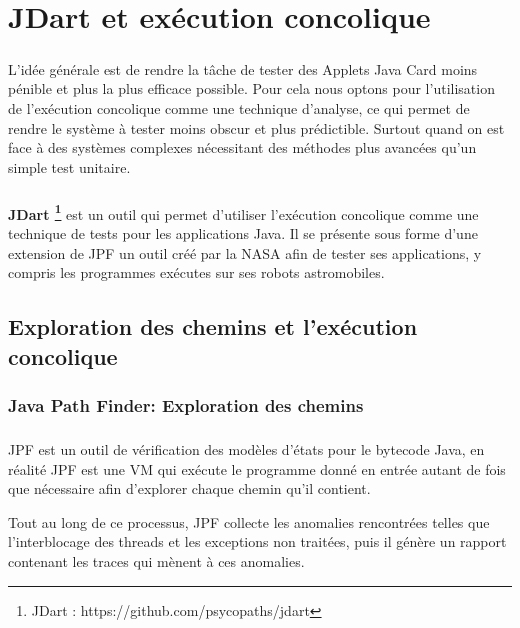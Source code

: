 \chapter{JDart et exécution concolique}
	\paragraph{}
		L'idée générale est de rendre la tâche de tester des Applets Java Card moins pénible et plus la plus efficace possible.
		Pour cela nous optons pour l'utilisation de l'exécution concolique comme une technique d'analyse, ce qui permet de rendre 
		le système à tester moins obscur et plus prédictible. Surtout quand on est face à des systèmes complexes
		nécessitant des méthodes plus avancées qu'un simple test unitaire.
    
	\paragraph{}
		\textbf{JDart \footnote{JDart : https://github.com/psycopaths/jdart}} est un outil qui permet d'utiliser l'exécution concolique
		comme une technique de tests pour les applications Java.
		\newline
		Il se présente sous forme d'une extension de \gls{JPF} un outil créé par la NASA afin de tester ses applications, y compris les programmes exécutes sur ses robots astromobiles.
	\section{Exploration des chemins et l'exécution concolique}
		\subsection{Java Path Finder: Exploration des chemins}
			\nocite{JPF}
			
			\paragraph{}
				\gls{JPF} est un outil de vérification des modèles d'états pour le bytecode Java,
				en réalité \gls{JPF} est une \gls{VM} qui exécute le programme donné en entrée autant de fois que nécessaire
				afin d'explorer chaque chemin qu'il contient.
				
				Tout au long de ce processus, \gls{JPF} collecte les anomalies rencontrées telles que l'interblocage des threads et les exceptions non traitées, puis il génère un rapport contenant les traces qui mènent à ces anomalies.
	
